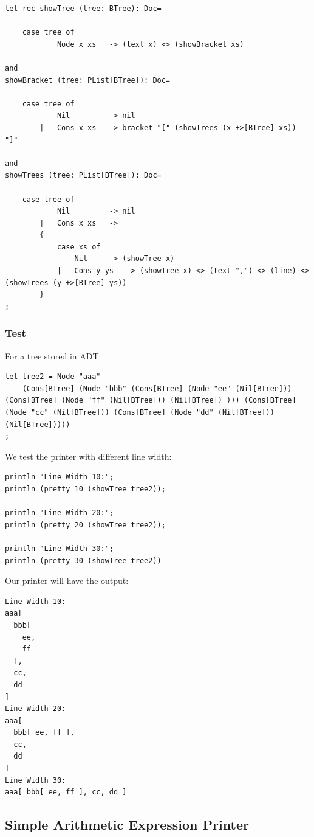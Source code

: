 \begin{lstlisting}
let rec showTree (tree: BTree): Doc=

    case tree of
            Node x xs   -> (text x) <> (showBracket xs)
            
and
showBracket (tree: PList[BTree]): Doc=

    case tree of
            Nil         -> nil
        |   Cons x xs   -> bracket "[" (showTrees (x +>[BTree] xs)) "]"
        
and
showTrees (tree: PList[BTree]): Doc=

    case tree of
            Nil         -> nil
        |   Cons x xs   ->
        {
            case xs of
                Nil     -> (showTree x)
            |   Cons y ys   -> (showTree x) <> (text ",") <> (line) <> (showTrees (y +>[BTree] ys))
        }
;
\end{lstlisting}

\subsubsection{Test}

For a tree stored in ADT:
\begin{lstlisting}
let tree2 = Node "aaa"
    (Cons[BTree] (Node "bbb" (Cons[BTree] (Node "ee" (Nil[BTree])) (Cons[BTree] (Node "ff" (Nil[BTree])) (Nil[BTree]) ))) (Cons[BTree] (Node "cc" (Nil[BTree])) (Cons[BTree] (Node "dd" (Nil[BTree])) (Nil[BTree]))))
;
\end{lstlisting}

We test the printer with different line width:
\begin{lstlisting}
println "Line Width 10:";
println (pretty 10 (showTree tree2));

println "Line Width 20:";
println (pretty 20 (showTree tree2));

println "Line Width 30:";
println (pretty 30 (showTree tree2))
\end{lstlisting}

Our printer will have the output:
\begin{lstlisting}
Line Width 10:
aaa[
  bbb[
    ee,
    ff
  ],
  cc,
  dd
]
Line Width 20:
aaa[
  bbb[ ee, ff ],
  cc,
  dd
]
Line Width 30:
aaa[ bbb[ ee, ff ], cc, dd ]
\end{lstlisting}

\subsection{Simple Arithmetic Expression Printer}

